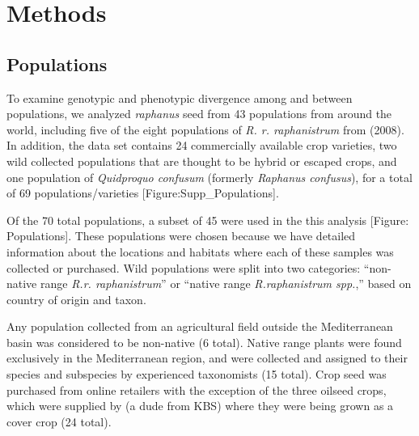 \documentclass[twocolumn]{bmcart}%
\begin{document}
\section*{Methods}
%
%
%

\subsection*{Populations}

To examine genotypic and phenotypic divergence among and between populations, we analyzed \textit{raphanus} seed from 43 populations from around the world, including five of the eight populations of \textit{R. r. raphanistrum} from (2008). In addition, the data set contains 24 commercially available crop varieties, two wild collected populations that are thought to be hybrid or escaped crops, and one population of \textit{Quidproquo confusum} (formerly \textit{Raphanus confusus}), for a total of 69 populations/varieties [Figure:Supp\_Populations].
%
%
%

Of the 70 total populations, a subset of 45 were used in the this analysis [Figure: Populations]. These populations were chosen because we have detailed information about the locations and habitats where each of these samples was collected or purchased. Wild populations were split into two categories: “non-native range \textit{R.r. raphanistrum}” or “native range \textit{R.raphanistrum spp.},” based on country of origin and taxon.
%
%
%

Any population collected from an agricultural field outside the Mediterranean basin was considered to be non-native (6 total). Native range plants were found exclusively in the Mediterranean region, and were collected and assigned to their species and subspecies by experienced taxonomists (15 total). Crop seed was purchased from online retailers with the exception of the three oilseed crops, which were supplied by (a dude from KBS) where they were being grown as a cover crop (24 total).
%
%
%
\end{document}
